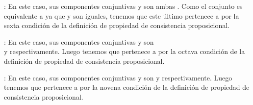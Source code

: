 \begin{isabellebody}
\begin{isamarkuptext}
\begin{demostracion}
  : En este caso, sus componentes conjuntivas  y  son 
    ambas . Como el conjunto  es equivalente a  ya
    que  y  son iguales, tenemos que este último pertenece a  por la sexta 
    condición de la definición de propiedad de consistencia proposicional.

  : En este caso, sus componentes conjuntivas  y  son\\ 
     y  respectivamente. Luego tenemos que   pertenece a  por
    la octava condición de la definición de propiedad de consistencia proposicional.

  : En este caso, sus componentes conjuntivas  y  son  y 
     respectivamente. Luego tenemos que   pertenece a  por la novena 
    condición de la definición de propiedad de consistencia proposicional.


\end{demostracion}
\end{isamarkuptext}
\end{isabellebody}
